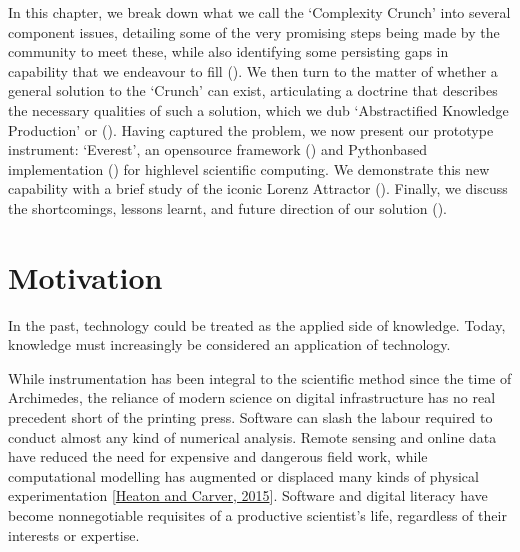 \documentclass[letterpaper,10pt,english]{jupyterBook}
\begin{document}
\sphinxAtStartPar
In this chapter, we break down what we call the ‘Complexity Crunch’ into several component issues, detailing some of the very promising steps being made by the community to meet these, while also identifying some persisting gaps in capability that we endeavour to fill ({\hyperref[\detokenize{content/chapter_03_everest/motivation::doc}]{}}). We then turn to the matter of whether a general solution to the ‘Crunch’ can exist, articulating a doctrine that describes the necessary qualities of such a solution, which we dub ‘Abstractified Knowledge Production’ or  ({\hyperref[\detokenize{content/chapter_03_everest/doctrine::doc}]{}}). Having captured the problem, we now present our prototype  instrument: ‘Everest’, an open\sphinxhyphen{}source framework ({\hyperref[\detokenize{content/chapter_03_everest/framework::doc}]{}}) and Python\sphinxhyphen{}based implementation ({\hyperref[\detokenize{content/chapter_03_everest/implementation::doc}]{}}) for high\sphinxhyphen{}level scientific computing. We demonstrate this new capability with a brief study of the iconic Lorenz Attractor ({\hyperref[\detokenize{content/chapter_03_everest/demonstration::doc}]{}}). Finally, we discuss the shortcomings, lessons learnt, and future direction of our solution ({\hyperref[\detokenize{content/chapter_03_everest/discussion::doc}]{}}).


\section{Motivation}
\label{\detokenize{content/chapter_03_everest/motivation:motivation}}\label{\detokenize{content/chapter_03_everest/motivation::doc}}
\sphinxAtStartPar
In the past, technology could be treated as the applied side of knowledge. Today, knowledge must increasingly be considered an application of technology.

\sphinxAtStartPar
While instrumentation has been integral to the scientific method since the time of Archimedes, the reliance of modern science on digital infrastructure has no real precedent short of the printing press. Software can slash the labour required to conduct almost any kind of numerical analysis. Remote sensing and online data have reduced the need for expensive and dangerous field work, while computational modelling has augmented or displaced many kinds of physical experimentation {[}\hyperlink{cite.references:id973}{Heaton and Carver, 2015}{]}. Software and digital literacy have become non\sphinxhyphen{}negotiable requisites of a productive scientist’s life, regardless of their interests or expertise.
\end{document}

